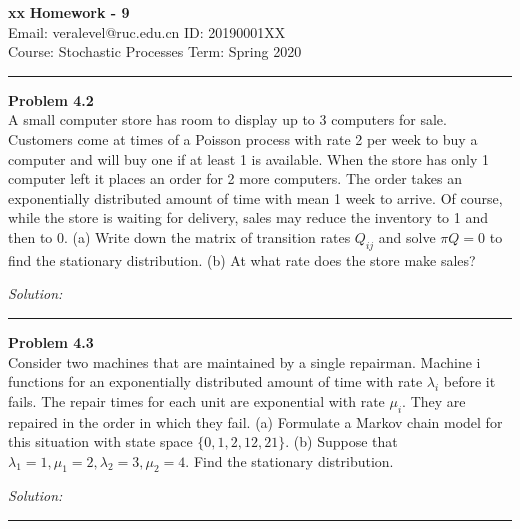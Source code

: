 \documentclass[a4paper, 11pt]{article}
\newenvironment{problem}[2][Problem]
    { \begin{mdframed}[backgroundcolor=gray!20] \textbf{#1 #2} \\}
    {  \end{mdframed}}
\newenvironment{solution}
    {\textit{Solution:}}
    {}
\begin{document}
\noindent
\large\textbf{xx} \hfill \textbf{Homework - 9}   \\
Email: veralevel@ruc.edu.cn \hfill ID: 20190001XX \\
\normalsize Course: Stochastic Processes \hfill Term: Spring 2020\\
\noindent\rule{7in}{2.8pt}
\begin{problem}{4.2}
A small computer store has room to display up to 3 computers for sale. Customers come at times of a Poisson process with rate 2 per week to buy a computer and will buy one if at least 1 is available. When the store has only 1 computer left it places an order for 2 more computers. The order takes an exponentially distributed amount of time with mean 1 week to arrive. Of course, while the store is waiting for delivery, sales may reduce the inventory to 1 and then to 0. (a) Write down the matrix of transition rates $Q_{ij}$ and solve $\pi Q = 0$ to find the stationary distribution. (b) At what rate does the store make sales?
\end{problem}
\begin{solution}

\end{solution} 
\noindent\rule{7in}{2.8pt}


\begin{problem}{4.3}
Consider two machines that are maintained by a single repairman. Machine i functions for an exponentially distributed amount of time with rate $\lambda_i$ before it fails. The repair times for each unit are exponential with rate $\mu_i$. They are repaired in the order in which they fail. (a) Formulate a Markov chain model for this situation with state space $\{0, 1, 2, 12, 21\}$. (b) Suppose that $\lambda_1 = 1, \mu_1 = 2, \lambda_2 = 3, \mu_2 = 4$. Find the stationary distribution.
\end{problem}
\begin{solution}


\end{solution} 
%
\noindent\rule{7in}{2.8pt}
\end{document}
